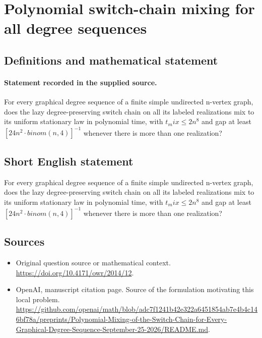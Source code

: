 \documentclass[11pt]{article}
\begin{document}
\section*{Polynomial switch-chain mixing for all degree sequences}\label{statement}
\subsection{Definitions and mathematical statement}
\paragraph{Statement recorded in the supplied source.}
For every graphical degree sequence of a finite simple undirected n-vertex graph, does the lazy degree-preserving switch chain on all its labeled realizations mix to its uniform stationary law in polynomial time, with $t_mix\leq 2n^{8}$ and gap at least $[24n^{2}\cdot binom(n,4)]^{-1}$ whenever there is more than one realization?
\subsection{Short English statement}
For every graphical degree sequence of a finite simple undirected n-vertex graph, does the lazy degree-preserving switch chain on all its labeled realizations mix to its uniform stationary law in polynomial time, with $t_mix\leq 2n^{8}$ and gap at least $[24n^{2}\cdot binom(n,4)]^{-1}$ whenever there is more than one realization?
\subsection{Sources}
\begin{itemize}
\item[S1] Original question source or mathematical context.
\url{https://doi.org/10.4171/owr/2014/12}.
\item[S2] OpenAI, manuscript citation page. Source of the formulation motivating this local problem.
\url{https://github.com/openai/math/blob/adc7f1241b42e322a6451854ab7e4b4c146bf78a/preprints/Polynomial-Mixing-of-the-Switch-Chain-for-Every-Graphical-Degree-Sequence-September-25-2026/README.md}.
\end{itemize}
\end{document}
